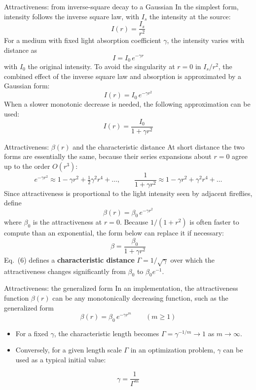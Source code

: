 \documentclass[aspectratio=169,11pt]{beamer}
\begin{document}
\begin{frame}[t]{Attractiveness: from inverse-square decay to a Gaussian}
\small
In the simplest form, intensity follows the inverse square law, with $I_s$ the intensity at the source:
\[I(r)=\frac{I_s}{r^{2}}\]
For a medium with fixed light absorption coefficient $\gamma$, the intensity varies with distance as
\[I=I_0\,e^{-\gamma r}\]
with $I_0$ the original intensity. To avoid the singularity at $r=0$ in $I_s/r^2$, the combined effect of the inverse square law and absorption is approximated by a Gaussian form:
\begin{equation*}I(r)=I_0\,e^{-\gamma r^{2}}\tag{3}\end{equation*}
When a slower monotonic decrease is needed, the following approximation can be used:
\begin{equation*}I(r)=\frac{I_0}{1+\gamma r^{2}}\tag{4}\end{equation*}
\end{frame}

\begin{frame}[t]{Attractiveness: $\beta(r)$ and the characteristic distance}
\small
At short distance the two forms are essentially the same, because their series expansions about $r=0$ agree up to the order $O(r^3)$:
\begin{equation*}e^{-\gamma r^{2}}\approx 1-\gamma r^{2}+\tfrac12\gamma^{2}r^{4}+\dots,\qquad \frac{1}{1+\gamma r^{2}}\approx 1-\gamma r^{2}+\gamma^{2}r^{4}+\dots\tag{5}\end{equation*}
Since attractiveness is proportional to the light intensity seen by adjacent fireflies, define
\begin{equation*}\beta(r)=\beta_0\,e^{-\gamma r^{2}}\tag{6}\end{equation*}
where $\beta_0$ is the attractiveness at $r=0$. Because $1/(1+r^2)$ is often faster to compute than an exponential, the form below can replace it if necessary:
\[\beta=\frac{\beta_0}{1+\gamma r^{2}}\]
Eq.~(6) defines a \textbf{characteristic distance} $\Gamma=1/\sqrt{\gamma}$ over which the attractiveness changes significantly from $\beta_0$ to $\beta_0 e^{-1}$.
\end{frame}

\begin{frame}[t]{Attractiveness: the generalized form}
In an implementation, the attractiveness function $\beta(r)$ can be any monotonically decreasing function, such as the generalized form
\begin{equation*}\beta(r)=\beta_0\,e^{-\gamma r^{m}}\qquad(m\ge 1)\tag{7}\end{equation*}
\begin{itemize}\itemsep0.5em
  \item For a fixed $\gamma$, the characteristic length becomes $\Gamma=\gamma^{-1/m}\to 1$ as $m\to\infty$.
  \item Conversely, for a given length scale $\Gamma$ in an optimization problem, $\gamma$ can be used as a typical initial value:
\end{itemize}
\[\gamma=\frac{1}{\Gamma^{m}}\]
\end{frame}
\end{document}
